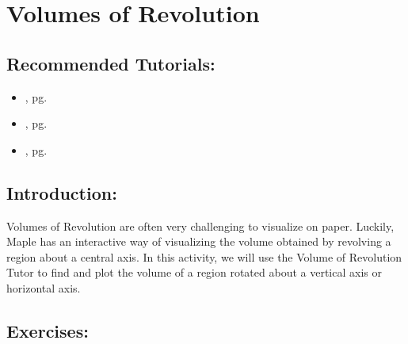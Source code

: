 \section{Volumes of Revolution}
\label{sec:volumes_of_revolution}	

\subsection*{Recommended Tutorials:}
\begin{itemize}[noitemsep]
	\item {}, pg. \pageref{chp:equation_solvers}
	\item {}, pg. \pageref{chp:implicit_functions}
	\item {}, pg. \pageref{chp:definite_and_indefinite_Integrals}
\end{itemize}

\subsection*{Introduction:}

Volumes of Revolution are often very challenging to visualize on paper. Luckily, Maple has an interactive way of visualizing the volume obtained by revolving a region about a central axis. In this activity, we will use the Volume of Revolution Tutor to find and plot the volume of a region rotated about a vertical axis or horizontal axis.

\subsection*{Exercises:}

